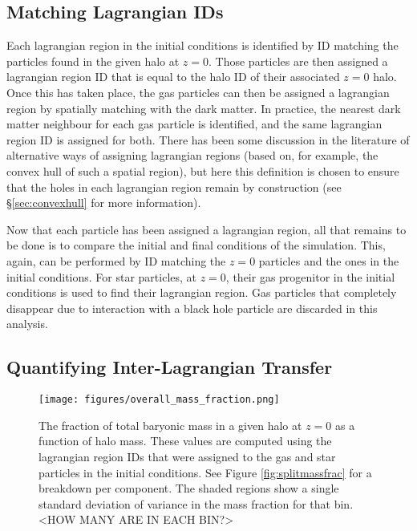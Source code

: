 \subsection{Matching Lagrangian IDs}

Each lagrangian region in the initial conditions is identified by ID matching the particles found in the given halo at $z=0$. Those particles are then assigned a lagrangian region ID that is equal to the halo ID of their associated $z=0$ halo. Once this has taken place, the gas particles can then be assigned a lagrangian region by spatially matching with the dark matter. In practice, the nearest dark matter neighbour for each gas particle is identified, and the same lagrangian region ID is assigned for both. There has been some discussion in the literature of alternative ways of assigning lagrangian regions (based on, for example, the convex hull of such a spatial region), but here this definition is chosen to ensure that the holes in each lagrangian region remain by construction (see \S \ref{sec:convexhull} for more information).

Now that each particle has been assigned a lagrangian region, all that remains to be done is to compare the initial and final conditions of the simulation. This, again, can be performed by ID matching the $z=0$ particles and the ones in the initial conditions. For star particles, at $z=0$, their gas progenitor in the initial conditions is used to find their lagrangian region. Gas particles that completely disappear due to interaction with a black hole particle are discarded in this analysis.

\subsection{Quantifying Inter-Lagrangian Transfer}

\begin{figure}
    \centering
    \texttt{[image: figures/overall\_mass\_fraction.png]}
    \caption{The fraction of total baryonic mass in a given halo at $z=0$ as a function of halo mass. These values are computed using the lagrangian region IDs that were assigned to the gas and star particles in the initial conditions. See Figure \ref{fig:splitmassfrac} for a breakdown per component. The shaded regions show a single standard deviation of variance in the mass fraction for that bin. <HOW MANY ARE IN EACH BIN?>}
    \label{fig:massfrac}
\end{figure}

